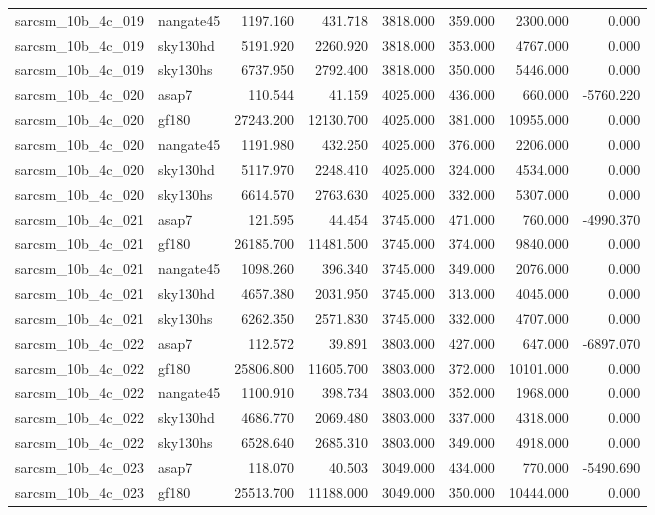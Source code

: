 \begin{tabular}{llrrrrrr}
sarcsm\_10b\_4c\_019 & nangate45 & 1197.160 & 431.718 & 3818.000 & 359.000 & 2300.000 & 0.000 \\
sarcsm\_10b\_4c\_019 & sky130hd & 5191.920 & 2260.920 & 3818.000 & 353.000 & 4767.000 & 0.000 \\
sarcsm\_10b\_4c\_019 & sky130hs & 6737.950 & 2792.400 & 3818.000 & 350.000 & 5446.000 & 0.000 \\
sarcsm\_10b\_4c\_020 & asap7 & 110.544 & 41.159 & 4025.000 & 436.000 & 660.000 & -5760.220 \\
sarcsm\_10b\_4c\_020 & gf180 & 27243.200 & 12130.700 & 4025.000 & 381.000 & 10955.000 & 0.000 \\
sarcsm\_10b\_4c\_020 & nangate45 & 1191.980 & 432.250 & 4025.000 & 376.000 & 2206.000 & 0.000 \\
sarcsm\_10b\_4c\_020 & sky130hd & 5117.970 & 2248.410 & 4025.000 & 324.000 & 4534.000 & 0.000 \\
sarcsm\_10b\_4c\_020 & sky130hs & 6614.570 & 2763.630 & 4025.000 & 332.000 & 5307.000 & 0.000 \\
sarcsm\_10b\_4c\_021 & asap7 & 121.595 & 44.454 & 3745.000 & 471.000 & 760.000 & -4990.370 \\
sarcsm\_10b\_4c\_021 & gf180 & 26185.700 & 11481.500 & 3745.000 & 374.000 & 9840.000 & 0.000 \\
sarcsm\_10b\_4c\_021 & nangate45 & 1098.260 & 396.340 & 3745.000 & 349.000 & 2076.000 & 0.000 \\
sarcsm\_10b\_4c\_021 & sky130hd & 4657.380 & 2031.950 & 3745.000 & 313.000 & 4045.000 & 0.000 \\
sarcsm\_10b\_4c\_021 & sky130hs & 6262.350 & 2571.830 & 3745.000 & 332.000 & 4707.000 & 0.000 \\
sarcsm\_10b\_4c\_022 & asap7 & 112.572 & 39.891 & 3803.000 & 427.000 & 647.000 & -6897.070 \\
sarcsm\_10b\_4c\_022 & gf180 & 25806.800 & 11605.700 & 3803.000 & 372.000 & 10101.000 & 0.000 \\
sarcsm\_10b\_4c\_022 & nangate45 & 1100.910 & 398.734 & 3803.000 & 352.000 & 1968.000 & 0.000 \\
sarcsm\_10b\_4c\_022 & sky130hd & 4686.770 & 2069.480 & 3803.000 & 337.000 & 4318.000 & 0.000 \\
sarcsm\_10b\_4c\_022 & sky130hs & 6528.640 & 2685.310 & 3803.000 & 349.000 & 4918.000 & 0.000 \\
sarcsm\_10b\_4c\_023 & asap7 & 118.070 & 40.503 & 3049.000 & 434.000 & 770.000 & -5490.690 \\
sarcsm\_10b\_4c\_023 & gf180 & 25513.700 & 11188.000 & 3049.000 & 350.000 & 10444.000 & 0.000 \\

\end{tabular}
